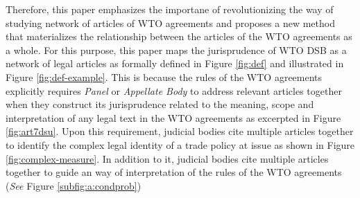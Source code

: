 


Therefore, this paper emphasizes the importane of revolutionizing the way of studying network of articles of WTO agreements and proposes a new method that
materializes the relationship between the articles of the WTO agreements as a whole. 
For this purpose, this paper maps
the jurisprudence of WTO DSB
as a network of legal articles
as formally defined in Figure \ref{fig:def} and illustrated in Figure \ref{fig:def-example}. This is because the rules of the WTO agreements
explicitly requires \textit{Panel} or \textit{Appellate Body} to address
relevant articles together when they construct its jurisprudence related to the meaning, scope and interpretation of any legal text in the WTO agreements as excerpted in Figure \ref{fig:art7dsu}.
Upon this requirement, judicial bodies cite
multiple articles together
to identify the complex legal identity of a trade policy at issue as shown in Figure \ref{fig:complex-measure}.
In addition to it, judicial bodies cite multiple articles together
to guide an way of interpretation of the rules of the WTO agreements (\textit{See} Figure \ref{subfig:a:condprob})




